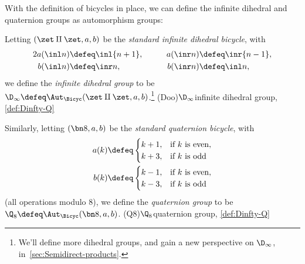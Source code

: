 With the definition of bicycles in place, we can
define the infinite dihedral
and quaternion groups
as automorphism groups:
\begin{definition}\label{def:Dinfty-Q}
  Letting $(\zet\amalg\zet, a, b)$ be the \emph{standard infinite dihedral
    bicycle}, with
  \begin{alignat*}2
    a(\inl n) &\defeq \inl{n+1},\qquad & a(\inr n) &\defeq \inr{n-1}, \\
    b(\inl n) &\defeq \inr n,          & b(\inr n) &\defeq \inl n,
  \end{alignat*}
  we define the \emph{infinite dihedral group}
  to be $\D_\infty \defeq \Aut_\Bicyc(\zet\amalg\zet,a,b)$.\footnote{%
    We'll define more dihedral groups, and gain a new perspective
    on $\D_\infty$, in~\cref{sec:Semidirect-products}.}%
  \glossary(Doo){$\protect\D_\infty$}{infinite dihedral group,
      \cref{def:Dinfty-Q}}

  Similarly, letting $(\bn 8, a, b)$ be the \emph{standard quaternion
    bicycle}, with
  \begin{align*}
    a(k) &\defeq
           \begin{cases}
             k+1, &\text{if $k$ is even},\\
             k+3, &\text{if $k$ is odd}
           \end{cases} \\
    b(k) &\defeq
           \begin{cases}
             k-1, &\text{if $k$ is even},\\
             k-3, &\text{if $k$ is odd}
           \end{cases}
  \end{align*}
  (all operations modulo $8$),
  we define the \emph{quaternion group}
  to be $\Q_8\defeq\Aut_\Bicyc(\bn 8,a,b)$.%
  \glossary(Q8){$\protect\Q_8$}{quaternion group,
      \cref{def:Dinfty-Q}}
\end{definition}


